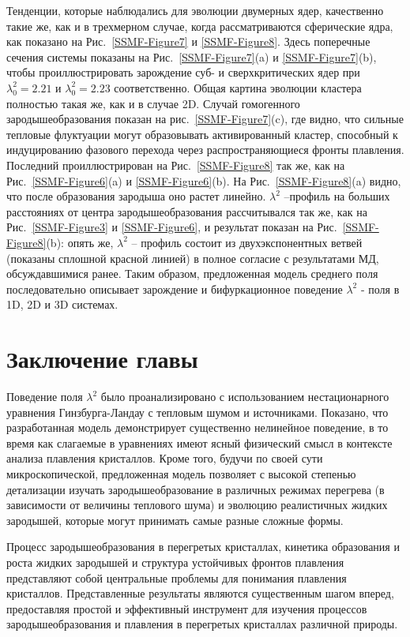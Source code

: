 Тенденции, которые наблюдались для эволюции двумерных ядер, качественно такие же, как и в трехмерном случае, когда рассматриваются сферические ядра, как показано на Рис.~\ref{SSMF-Figure7} и \ref{SSMF-Figure8}. Здесь поперечные сечения системы показаны на Рис.~\ref{SSMF-Figure7}(a) и \ref{SSMF-Figure7}(b), чтобы проиллюстрировать зарождение суб- и сверхкритических ядер при $\lambda_0^2 = 2.21$ и $\lambda_0^2 = 2.23$ соответственно.
Общая картина эволюции кластера полностью такая же, как и в случае 2D. Случай гомогенного зародышеобразования показан на рис.~\ref{SSMF-Figure7}(c), где видно, что сильные тепловые флуктуации могут образовывать активированный кластер, способный к индуцированию фазового перехода через распространяющиеся фронты плавления. Последний проиллюстрирован на Рис.~\ref{SSMF-Figure8} так же, как на Рис.~\ref{SSMF-Figure6}(a) и \ref{SSMF-Figure6}(b).
На Рис.~\ref{SSMF-Figure8}(a) видно, что после образования зародыша оно растет линейно. $\lambda ^ 2$ --профиль на больших расстояниях от центра зародышеобразования рассчитывался так же, как на Рис.~\ref{SSMF-Figure3} и \ref{SSMF-Figure6}, и результат показан на Рис.~\ref{SSMF-Figure8}(b): опять же, $\lambda ^ 2$ -- профиль состоит из двухэкспонентных ветвей (показаны сплошной красной линией) в полное согласие с результатами МД, обсуждавшимися ранее. Таким образом, предложенная модель среднего поля последовательно описывает зарождение и бифуркационное поведение $\lambda ^ 2$ - поля в 1D, 2D и 3D системах.

\section{Заключение главы}

Поведение поля $\lambda^2$ было проанализировано с использованием нестационарного уравнения Гинзбурга-Ландау с тепловым шумом и источниками.
Показано, что разработанная модель демонстрирует существенно нелинейное поведение, в то время как слагаемые в уравнениях имеют ясный физический смысл в контексте анализа плавления кристаллов.
Кроме того, будучи по своей сути микроскопической, предложенная модель позволяет с высокой степенью детализации изучать зародышеобразование в различных режимах перегрева (в зависимости от величины теплового шума) и эволюцию реалистичных жидких зародышей, которые могут принимать самые разные сложные формы.


Процесс зародышеобразования в перегретых кристаллах, кинетика образования и роста жидких зародышей и структура устойчивых фронтов плавления представляют собой центральные проблемы для понимания плавления кристаллов.
Представленные результаты являются существенным шагом вперед, предоставляя простой и эффективный инструмент для изучения процессов зародышеобразования и плавления в перегретых кристаллах различной природы.

